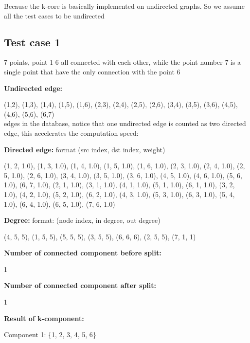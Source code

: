 Because the k-core is basically implemented on undirected graphs. So we assume all the test cases to be undirected \\

\subsection{Test case 1}
\par 7 points, point 1-6 all connected with each other, while the point number 7 is a single point that have the only connection with the point 6 \\

\par \textbf{Undirected edge:}
\par (1,2), (1,3), (1,4), (1,5), (1,6), (2,3), (2,4), (2,5), (2,6), (3,4), (3,5), (3,6), (4,5), (4,6), (5,6), (6,7) \\

edges in the database, notice that one undirected edge is counted as two directed edge, this accelerates the computation speed: \\
\par \textbf{Directed edge:}      format (src index, dst index, weight)
\par (1, 2, 1.0), (1, 3, 1.0), (1, 4, 1.0), (1, 5, 1.0), (1, 6, 1.0), (2, 3, 1.0), (2, 4, 1.0), (2, 5, 1.0), (2, 6, 1.0), (3, 4, 1.0), (3, 5, 1.0), (3, 6, 1.0), (4, 5, 1.0), (4, 6, 1.0), (5, 6, 1.0), (6, 7, 1.0), (2, 1, 1.0), (3, 1, 1.0), (4, 1, 1.0), (5, 1, 1.0), (6, 1, 1.0), (3, 2, 1.0), (4, 2, 1.0), (5, 2, 1.0), (6, 2, 1.0), (4, 3, 1.0), (5, 3, 1.0), (6, 3, 1.0), (5, 4, 1.0), (6, 4, 1.0), (6, 5, 1.0), (7, 6, 1.0) \\

\par \textbf{Degree:}      format: (node index, in degree, out degree)
\par (4, 5, 5), (1, 5, 5), (5, 5, 5), (3, 5, 5), (6, 6, 6), (2, 5, 5), (7, 1, 1) \\

\par \textbf{Number of connected component before split:}
\par 1\\
\par \textbf{Number of connected component after split:}
\par 1\\
\par \textbf{Result of k-component:}
\par Component 1: \{1, 2, 3, 4, 5, 6\}\\

